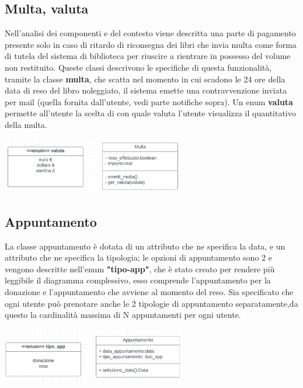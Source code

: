 \documentclass{article}
\begin{document}
\subsection{Multa, valuta}
Nell’analisi dei componenti e del contesto viene descritta una parte di pagamento presente solo in caso di ritardo di riconsegna dei libri che invia multa come forma di tutela del sistema di biblioteca per riuscire a rientrare in possesso del volume non restituito. Queste classi descrivono le specifiche di questa funzionalità, tramite la classe \textbf{multa},  che scatta nel momento in cui scadono le 24 ore della data di reso del libro noleggiato, il sistema emette una contravvenzione inviata per mail (quella fornita dall’utente, vedi parte notifiche sopra). Un enum \textbf{valuta} permette all’utente la  scelta di con quale valuta l’utente visualizza il quantitativo della multa. 
\begin{center}
        \includegraphics[width=80mm]{D3/Images/Multa.png}
\end{center}

\subsection{Appuntamento} La classe appuntamento è dotata di un attributo che ne specifica la data, e un attributo che ne specifica la tipologia; le opzioni di appuntamento sono 2 e vengono descritte nell’enum \textbf{"tipo-app"}, che è stato creato per rendere più leggibile il diagramma complessivo, esso comprende l'appuntamento per la donazione e l’appuntamento che avviene al momento del reso. Sia specificato che ogni utente può prenotare anche le 2 tipologie di appuntamento separatamente,da questo la cardinalità massima di N appuntamenti per ogni utente.
\begin{center}
        \includegraphics[width=80mm]{D3/Images/Appuntamento.png}
\end{center}
\end{document}
